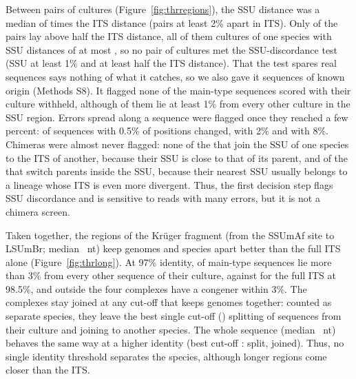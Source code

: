 \documentclass[11pt]{article}
\begin{document}
Between pairs of cultures (Figure~\ref{fig:thrregions}), the SSU distance was a median of \ThrPairsRatio{} times
the ITS distance (pairs at least 2\% apart in ITS). Only \ThrPairsAbove{} of the \ThrPairsN{} pairs lay above half
the ITS distance, all of them cultures of one species with SSU distances of at most \ThrPairsAboveMaxSSU{}, so no
pair of cultures met the SSU-discordance test (SSU at least 1\% and at least half the ITS distance). That the test
spares real sequences says nothing of what it catches, so we also gave it sequences of known origin (Methods S8). It
flagged none of the \AcRealN{} main-type sequences scored with their culture withheld, although \AcRealSSUOne{} of
them lie at least 1\% from every other culture in the SSU region. Errors spread along a sequence were flagged once
they reached a few percent: \AcErrHalf{} of \AcErrN{} sequences with 0.5\% of positions changed, \AcErrTwo{} with
2\% and \AcErrEight{} with 8\%. Chimeras were almost never flagged: none of the \AcJunctionN{} that join the SSU of
one species to the ITS of another, because their SSU is close to that of its parent, and \AcSSUChimFlag{} of the
\AcSSUChimN{} that switch parents inside the SSU, because their nearest SSU usually belongs to a lineage whose ITS is
even more divergent. Thus, the first decision step flags SSU discordance and is sensitive to reads with many errors,
but it is not a chimera screen.

Taken together, the regions of the Kr\"uger fragment (from the SSUmAf site to LSUmBr; median \LongKrMedian{}~nt)
keep genomes and species apart better than the full ITS alone (Figure~\ref{fig:thrlong}). At 97\% identity,
\LongKrNSSplit{} of main-type sequences lie more than 3\% from every other sequence of their culture, against
\LongITSNESplit{} for the full ITS at 98.5\%, and outside the four complexes \LongKrNSJoinX{} have a congener within
3\%. The complexes stay joined at any cut-off that keeps genomes together: counted as separate species, they leave the
best single cut-off (\LongKrBestId{}) splitting \LongKrBestSplit{} of sequences from their culture and joining
\LongKrBestJoin{} to another species. The whole sequence (median \LongFullMedian{}~nt) behaves the same way at a
higher identity (best cut-off \LongFullBestId{}: \LongFullBestSplit{} split, \LongFullBestJoin{} joined). Thus, no
single identity threshold separates the species, although longer regions come closer than the ITS.
\end{document}
